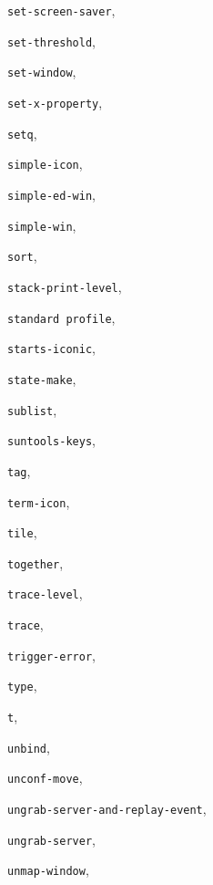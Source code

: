 \begin{theindex}
\item {\tt set-screen-saver}, {\bf\pageref{set-screen-saver}}
\item {\tt set-threshold}, {\bf\pageref{set-threshold}}
\item {\tt set-window}, {\bf\pageref{set-window}}
\item {\tt set-x-property}, {\bf\pageref{set-x-property}}
\item {\tt setq}, {\bf\pageref{setq}}
\item {\tt simple-icon}, {\bf\pageref{simple-icon}}
\item {\tt simple-ed-win}, {\bf\pageref{simple-ed-win}}
\item {\tt simple-win}, {\bf\pageref{simple-win}}
\item {\tt sort}, {\bf\pageref{sort}}
\item {\tt stack-print-level}, {\bf\pageref{stack-print-level}}
\item {\tt standard profile}, {\bf\pageref{standard-profile}}
\item {\tt starts-iconic}, {\bf\pageref{starts-iconic}}
\item {\tt state-make}, {\bf\pageref{state-make}}
\item {\tt sublist}, {\bf\pageref{sublist}}
\item {\tt suntools-keys}, {\bf\pageref{suntools-keys}}
\item {\tt tag}, {\bf\pageref{tag}}
\item {\tt term-icon}, {\bf\pageref{term-icon}}
\item {\tt tile}, {\bf\pageref{tile}}
\item {\tt together}, {\bf\pageref{together}}
\item {\tt trace-level}, {\bf\pageref{trace-level}}
\item {\tt trace}, {\bf\pageref{trace}}
\item {\tt trigger-error}, {\bf\pageref{trigger-error}}
\item {\tt type}, {\bf\pageref{type}}
\item {\tt t}, {\bf\pageref{t}}
\item {\tt unbind}, {\bf\pageref{unbind}}
\item {\tt unconf-move}, {\bf\pageref{unconf-move}}
\item {\tt ungrab-server-and-replay-event}, {\bf\pageref{ungrab-server-and-replay-event}}
\item {\tt ungrab-server}, {\bf\pageref{ungrab-server}}
\item {\tt unmap-window}, {\bf\pageref{unmap-window}}

\end{theindex}
